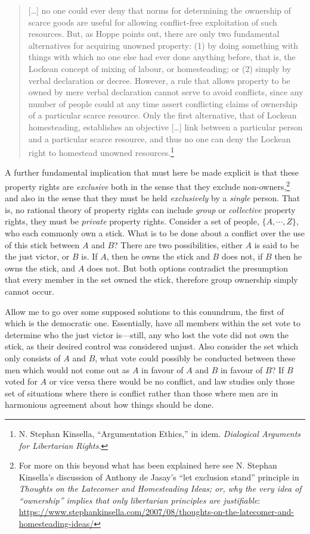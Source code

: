 \documentclass[11pt]{article}
\begin{document}
\begin{quote}
[\ldots{}] no one could ever deny that norms for determining the ownership of scarce goods are useful for allowing conflict-free exploitation of such resources. But, as Hoppe points out, there are only two fundamental alternatives for acquiring unowned property: (1) by doing something with things with which no one else had ever done anything before, that is, the Lockean concept of mixing of labour, or homesteading; or (2) simply by verbal declaration or decree. However, a rule that allows property to be owned by mere verbal declaration cannot serve to avoid conflicts, since any number of people could at any time assert conflicting claims of ownership of a particular scarce resource. Only the first alternative, that of Lockean homesteading, establishes an objective [\ldots{}] link between a particular person and a particular scarce resource, and thus no one can deny the Lockean right to homestead unowned resources.\footnote{N. Stephan Kinsella, ``Argumentation Ethics,'' in idem. \emph{Dialogical Arguments for Libertarian Rights}.}
\end{quote}

A further fundamental implication that must here be made explicit is that these property rights are \emph{exclusive} both in the sense that they exclude non-owners,\footnote{For more on this beyond what has been explained here see N. Stephan Kinsella's discussion of Anthony de Jasay's ``let exclusion stand'' principle in \emph{Thoughts on the Latecomer and Homesteading Ideas; or, why the very idea of “ownership” implies that only libertarian principles are justifiable}: \url{https://www.stephankinsella.com/2007/08/thoughts-on-the-latecomer-and-homesteading-ideas/}} and also in the sense that they must be held \emph{exclusively} by a \emph{single} person. That is, no rational theory of property rights can include \emph{group} or \emph{collective} property rights, they must be \emph{private} property rights. Consider a set of people, \(\{A,\cdots,Z\}\), who each commonly own a stick. What is to be done about a conflict over the use of this stick between \(A\) and \(B\)? There are two possibilities, either \(A\) is said to be the just victor, or \(B\) is. If \(A\), then he owns the stick and \(B\) does not, if \(B\) then he owns the stick, and \(A\) does not. But both options contradict the presumption that every member in the set owned the stick, therefore group ownership simply cannot occur.

Allow me to go over some supposed solutions to this conundrum, the first of which is the democratic one. Essentially, have all members within the set vote to determine who the just victor is---still, any who lost the vote did not own the stick, as their desired control was considered unjust. Also consider the set which only consists of \(A\) and \(B\), what vote could possibly be conducted between these men which would not come out as \(A\) in favour of \(A\) and \(B\) in favour of \(B\)? If \(B\) voted for \(A\) or vice versa there would be no conflict, and law studies only those set of situations where there is conflict rather than those where men are in harmonious agreement about how things should be done.
\end{document}
